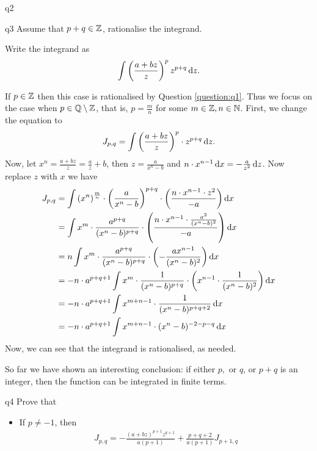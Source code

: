 \documentclass[reqno]{alittlebear}
\begin{document}
\begin{exercise}{}{}
\begin{question}{}{q2}
\begin{mathnote}
    \end{mathnote}
\end{question}
\newpage
\begin{question}{}{q3}
    Assume that $p+q\in\mathbb{Z}$, rationalise the integrand.
    \qbreak
    \begin{hint}
        Write the integrand as \[\int\left(\frac{a+bz}z\right)^pz^{p+q}\mathop{}\!\mathrm{d} z.\]
    \end{hint}
    \begin{mathnote}
        If $p\in\mathbb{Z}$ then this case is rationalised by Question \ref{question:q1}. Thus we focus on the case when $p\in\mathbb{Q}\setminus\mathbb{Z}$, that is, $p=\frac{m}{n}$ for some $m\in\mathbb{Z}, n\in\mathbb{N}$. First, we change the equation to \[\begin{aligned}J_{p,q}=\int \left(\frac{a+bz}{z}\right)^p\cdot z^{p+q}\mathop{}\!\mathrm{d} z.\end{aligned}\] Now, let $x^n=\frac{a+bz}{z}=\frac{a}z+b$, then $z=\frac{a}{x^n-b}$ and $n\cdot x^{n-1}\mathop{}\!\mathrm{d} x=-\frac{a}{z^2}\mathop{}\!\mathrm{d} z$. Now replace $z$ with $x$ we have \begin{align*}
            J_{p,q}&=\int \left(x^n\right)^{\frac{m}{n}}\cdot \left(\frac{a}{x^n-b}\right)^{p+q}\cdot\left(\frac{n\cdot x^{n-1}\cdot z^2}{-a}\right)\mathop{}\!\mathrm{d} x\\
            &=\int x^m \cdot \frac{a^{p+q}}{(x^n-b)^{p+q}}\cdot\left(\frac{n\cdot x^{n-1}\cdot \frac{a^2}{(x^n-b)^2}}{-a}\right)\mathop{}\!\mathrm{d} x\\
            &=n\int x^m \cdot \frac{a^{p+q}}{(x^n-b)^{p+q}}\cdot \left(-\frac{ax^{n-1}}{(x^n-b)^2}\right)\mathop{}\!\mathrm{d} x\\
            &=-n\cdot a^{p+q+1}\int x^m \cdot \frac{1}{(x^n-b)^{p+q}}\cdot\left(x^{n-1}\cdot \frac{1}{(x^n-b)^2}\right)\mathop{}\!\mathrm{d} x\\
            &=-n\cdot a^{p+q+1}\int x^{m+n-1} \cdot \frac{1}{(x^n-b)^{p+q+2}}\mathop{}\!\mathrm{d} x\\
            &=-n\cdot a^{p+q+1}\int x^{m+n-1} \cdot (x^n-b)^{-2-p-q} \mathop{}\!\mathrm{d} x\\
        \end{align*}
        Now, we can see that the integrand is rationalised, as needed.
    \end{mathnote}
    \begin{remark}
        So far we have shown an interesting conclusion: if either $p,$ or $q$, or $p+q$ is an integer, then the function can be integrated in finite terms.
    \end{remark}
\end{question}
\newpage
\begin{question}{}{q4}
    Prove that \begin{itemize}
        \item If $p\neq -1$, then \[\begin{aligned}J_{p,q}=-\frac{(a+bz)^{p+1}z^{q+1}}{a(p+1)}+\frac{p+q+2}{a(p+1)}J_{p+1,q}\end{aligned}\]

\end{itemize}
\end{question}
\end{exercise}
\end{document}
